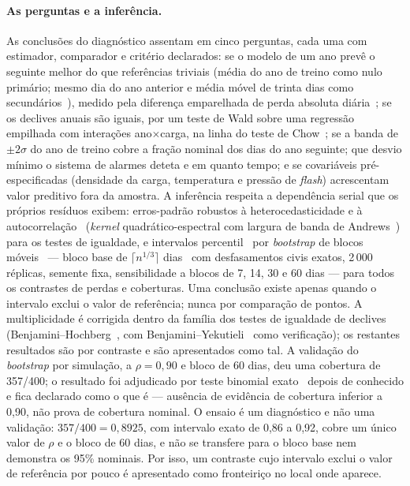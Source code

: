 \paragraph{As perguntas e a inferência.} As conclusões do diagnóstico
assentam em cinco perguntas, cada uma com estimador, comparador e
critério declarados: se o modelo de um ano prevê o seguinte melhor do que
referências triviais (média do ano de treino como nulo primário; mesmo dia
do ano anterior e média móvel de trinta dias como secundários~\cite{HyndmanKoehler2006}), medido
pela diferença emparelhada de perda absoluta diária~\cite{DieboldMariano1995,HarveyLeybourneNewbold1997}; se os declives anuais
são iguais, por um teste de Wald sobre uma regressão empilhada com
interações ano$\times$carga, na linha do teste de Chow~\cite{Chow1960}; se a banda de $\pm2\sigma$ do ano de treino
cobre a fração nominal dos dias do ano seguinte; que desvio mínimo o
sistema de alarmes deteta e em quanto tempo; e se covariáveis
pré-especificadas (densidade da carga, temperatura e pressão de
\emph{flash}) acrescentam valor preditivo fora da amostra. A inferência
respeita a dependência serial que os próprios resíduos exibem: erros-padrão
robustos à heterocedasticidade e à autocorrelação~\cite{NeweyWest1987}
(\emph{kernel} quadrático-espectral com largura de banda de
Andrews~\cite{Andrews1991}) para os testes de igualdade, e intervalos percentil~\cite{Efron1979,EfronTibshirani1993} por
\emph{bootstrap} de blocos móveis~\cite{Kunsch1989,Lahiri2003} --- bloco
base de $\lceil n^{1/3}\rceil$ dias~\cite{HallHorowitzJing1995} com
desfasamentos civis exatos, 2\,000 réplicas, semente fixa, sensibilidade a blocos de 7, 14,
30 e 60 dias --- para todos os contrastes de perdas e coberturas. Uma
conclusão existe apenas quando o intervalo exclui o valor de referência;
nunca por comparação de pontos. A multiplicidade é corrigida dentro da
família dos testes de igualdade de declives (Benjamini--Hochberg~\cite{BenjaminiHochberg1995}, com
Benjamini--Yekutieli~\cite{BenjaminiYekutieli2001} como verificação); os restantes resultados são por
contraste e são apresentados como tal. A validação do \emph{bootstrap} por
simulação, a $\rho = 0{,}90$ e bloco de 60 dias, deu uma cobertura de
357/400; o resultado foi adjudicado por teste binomial exato~\cite{ClopperPearson1934}
depois de conhecido e fica declarado como o que é --- ausência de evidência de
cobertura inferior a 0,90, não prova de cobertura nominal. O ensaio é um
diagnóstico e não uma validação: $357/400 = 0{,}8925$, com intervalo exato de
0,86 a 0,92, cobre um único valor de $\rho$ e o bloco de 60 dias, e não se
transfere para o bloco base nem demonstra os 95\% nominais. Por isso, um
contraste cujo intervalo exclui o valor de referência por pouco é
apresentado como fronteiriço no local onde aparece.

